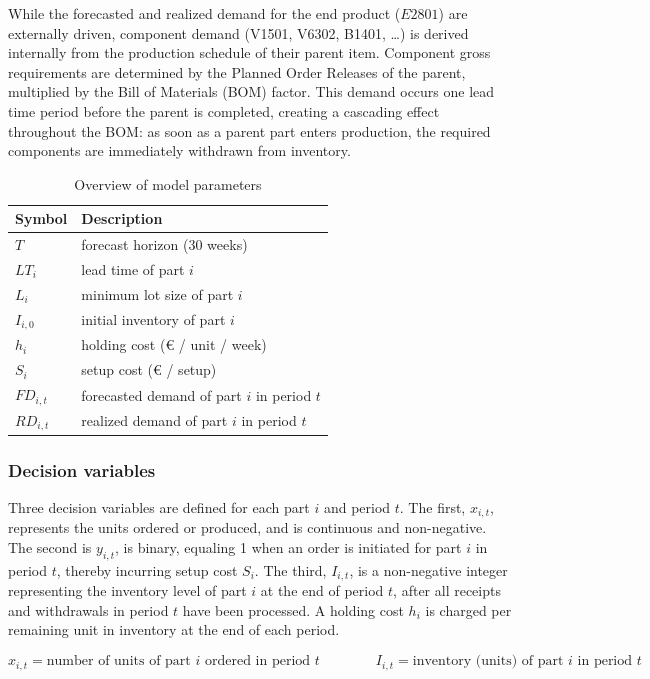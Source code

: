 \documentclass[a4paper,faculty=eb,language=en,doctype=article,sftitles=false]{ugent-doc}
\begin{document}
While the forecasted and realized demand for the end product ($E2801$) are externally driven, component demand (V1501, V6302, B1401, \ldots) is derived internally from the production schedule of their parent item. Component gross requirements are determined by the Planned Order Releases of the parent, multiplied by the Bill of Materials (BOM) factor. This demand occurs one lead time period before the parent is completed, creating a cascading effect throughout the BOM: as soon as a parent part enters production, the required components are immediately withdrawn from inventory.

\begin{table}[H]
\centering
\begin{tabular}{ll}
\toprule
\textbf{Symbol} & \textbf{Description} \\
\midrule
$T$ & forecast horizon (30 weeks) \\
$LT_i$ & lead time of part $i$ \\
$L_i$ & minimum lot size of part $i$ \\
$I_{i,0}$ & initial inventory of part $i$ \\
$h_i$ & holding cost (€ / unit / week) \\
$S_i$ & setup cost (€ / setup) \\
$FD_{i,t}$ & forecasted demand of part $i$ in period $t$ \\
$RD_{i,t}$ & realized demand of part $i$ in period $t$ \\
\bottomrule
\end{tabular}
\caption{Overview of model parameters}
\end{table}

\subsubsection{Decision variables}

Three decision variables are defined for each part $i$ and period $t$. The first, $x_{i,t}$, represents the units ordered or produced, and is continuous and non-negative. The second is $y_{i,t}$, is binary, equaling 1 when an order is initiated for part $i$ in period $t$, thereby incurring setup cost $S_i$. The third, $I_{i,t}$, is a non-negative integer representing the inventory level of part $i$ at the end of period $t$, after all receipts and withdrawals in period $t$ have been processed. A holding cost $h_i$ is charged per remaining unit in inventory at the end of each period.

\[
x_{i,t} = \text{number of units of part } i \text{ ordered in period } t
\qquad\qquad
I_{i,t} = \text{inventory (units) of part } i \text{ in period } t
\]
\end{document}
